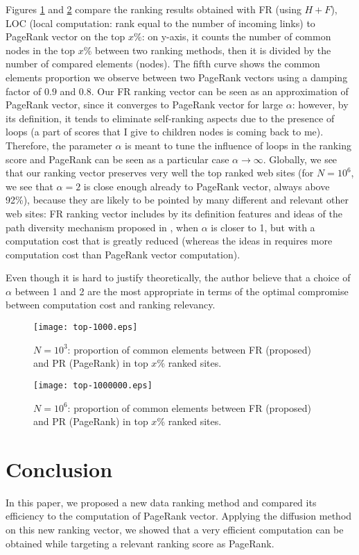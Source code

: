\documentclass[conference]{IEEEtran}
\begin{document}
\begin{psfrags}
Figures \ref{fig:top3} and \ref{fig:top6} compare the ranking results obtained with FR (using $H+F$), 
LOC (local computation: rank equal to the number of incoming links) to PageRank vector on the top $x$\%: 
on y-axis, it counts the number of common nodes in the top $x$\% between two ranking methods, then it is divided by
the number of compared elements (nodes). 
The fifth curve shows the common elements proportion we observe between two PageRank vectors using a damping factor of $0.9$ and $0.8$.
Our FR ranking vector can be seen as an approximation of PageRank vector, since it converges to PageRank vector
for large $\alpha$: however, by its definition,
it tends to eliminate self-ranking aspects due to the presence of loops (a part of scores that I give to children nodes
is coming back to me). Therefore, the parameter $\alpha$ is meant to tune the influence of loops in the ranking score
and PageRank can be seen as a particular case $\alpha\to\infty$.
Globally, we see that our ranking vector preserves very well the top ranked web sites
(for $N=10^6$, we see that $\alpha=2$ is close enough already to PageRank vector, always above 92\%), because they
are likely to be pointed by many different and relevant other web sites: FR ranking vector
includes by its definition features and ideas of the path diversity mechanism proposed in \cite{diversity},
when $\alpha$ is closer to 1, but with a computation cost that is greatly reduced (whereas the ideas in \cite{diversity}
requires more computation cost than PageRank vector computation).


Even though it is hard to justify theoretically, the author believe that a choice of $\alpha$
between 1 and 2 are the most appropriate in terms of the optimal compromise between computation
cost and ranking relevancy.



\begin{figure}[htbp]
\centering
\texttt{[image: top-1000.eps]}
\caption{$N=10^3$: proportion of common elements between FR (proposed) and PR (PageRank) in top $x$\% ranked sites.}
\label{fig:top3}
\end{figure}

\begin{figure}[htbp]
\centering
\texttt{[image: top-1000000.eps]}
\caption{$N=10^6$: proportion of common elements between FR (proposed) and PR (PageRank) in top $x$\% ranked sites.}
\label{fig:top6}
\end{figure}

\section{Conclusion}\label{sec:conclusion}
In this paper, we proposed a new data ranking method and compared its efficiency
to the computation of PageRank vector. Applying the diffusion method on this
new ranking vector, we showed that a very efficient computation can be obtained
while targeting a relevant ranking score as PageRank.

\end{psfrags}


\end{document}
